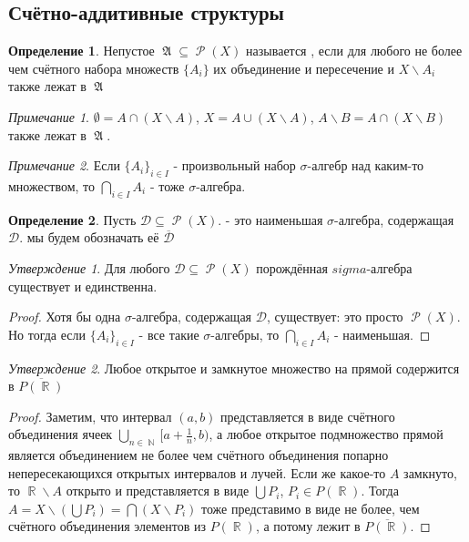 \documentclass[a4paper]{article}
\theoremstyle{indented}
\theoremstyle{definition}
\newtheorem{defn}{Определение}
\theoremstyle{remark}
\newtheorem{remark}{Примечание}
\newtheorem{stat}{Утверждение}
\DeclareMathOperator{\RR}{\mathbb{R}}
\DeclareMathOperator{\NN}{\mathbb{N}}
\DeclareMathOperator{\GA}{\mathfrak{A}}
\DeclareMathOperator{\Rho}{\mathcal{P}}
\begin{document}
\subsection{Счётно-аддитивные структуры}
\begin{defn}
Непустое $\GA \subseteq \Rho(X)$ называется , если для любого не более чем счётного набора множеств $\{A_i\}$ их объединение и пересечение и $X \backslash A_i$ также лежат в $\GA$
\end{defn}
\begin{remark}
$\emptyset = A \cap (X \backslash A)$, $X= A \cup (X \backslash A)$, $A \backslash B = A \cap (X \backslash B)$ также лежат в $\GA$.
\end{remark}
\begin{remark}
Если $\{A_i\}_{i \in I}$ - произвольный набор $\sigma$-алгебр над каким-то множеством, то $\bigcap_{i \in I} A_i$ - тоже $\sigma$-алгебра.
\end{remark}
\begin{defn}
Пусть $\mathcal{D} \subseteq \Rho(X)$.  - это наименьшая $\sigma$-алгебра, содержащая $\mathcal{D}$. мы будем обозначать её $\overline{\mathcal{D}}$
\end{defn}
\begin{stat}
Для любого $\mathcal{D} \subseteq \Rho(X)$ порождённая $sigma$-алгебра существует и единственна.
\end{stat}
\begin{proof}
Хотя бы одна $\sigma$-алгебра, содержащая $\mathcal{D}$, существует: это просто $\Rho(X)$. Но тогда если $\{A_i\}_{i \in I}$ - все такие $\sigma$-алгебры, то $\bigcap_{i \in I} A_i$ - наименьшая.
\end{proof}
\begin{stat}
Любое открытое и замкнутое множество на прямой содержится в $\overline{P(\RR)}$
\end{stat}
\begin{proof}
Заметим, что интервал $(a, b)$ представляется в виде счётного объединения ячеек $\bigcup_{n \in \NN} [a+\frac{1}{n}, b)$, а любое открытое подмножество прямой является объединением не более чем счётного объединения попарно непересекающихся открытых интервалов и лучей. Если же какое-то $A$ замкнуто, то $\RR \backslash A$ открыто и представляется в виде $\bigcup P_i$, $P_i \in P(\RR)$. Тогда $A=X \backslash (\bigcup P_i) = \bigcap (X \backslash P_i)$ тоже представимо в виде не более, чем счётного объединения элементов из $P(\RR)$, а потому лежит в $\overline{P(\RR)}$.
\end{proof}
\end{document}
